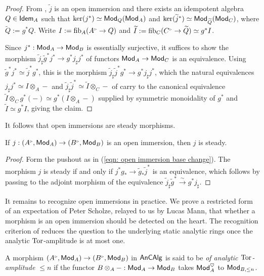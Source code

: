 \begin{proof}
    From , $\widetilde{j}$ is an open immersion and there exists an idempotent algebra $Q\in\mathsf{Idem}_{A}$ such that $\ker(j^{*})\simeq\mathsf{Mod}_{Q}(\mathsf{Mod}_{A})$ and $\ker(\widetilde{j}^{*})\simeq\mathsf{Mod}_{\widetilde{Q}}(\mathsf{Mod}_{C})$, where $\widetilde{Q}:=g^{*}Q$. Write $I:=\fib_{A}(A^{\tri}\to Q)$ and $\widetilde{I}:=\fib_{C}(C^{\tri}\to\widetilde{Q})\simeq g^{*}I$.

    Since $j^{*}:\mathsf{Mod}_{A}\to\mathsf{Mod}_{B}$ is essentially surjective, it suffices to show the morphism $\widetilde{j}_{\sharp}\widetilde{g}^{*}j^{*}\to g^{*}j_{\sharp}j^{*}$ of functors $\mathsf{Mod}_{A}\to\mathsf{Mod}_{C}$ is an equivalence. Using $\widetilde{g}^{*}j^{*}\simeq\widetilde{j}^{*}g^{*}$, this is the morphism $\widetilde{j}_{\sharp}\widetilde{j}^{*}g^{*}\to g^{*}j_{\sharp}j^{*}$, which the natural equivalences $j_{\sharp}j^{*}\simeq I\otimes_{A}-$ and $\widetilde{j}_{\sharp}\widetilde{j}^{*}\simeq\widetilde{I}\otimes_{C}-$ of \cite[Rmk. 5.1.5 (2)]{CamargoSolid} carry to the canonical equivalence $\widetilde{I}\otimes_{C}g^{*}(-)\simeq g^{*}(I\otimes_{A}-)$ supplied by symmetric monoidality of $g^{*}$ and $\widetilde{I}\simeq g^{*}I$, giving the claim.
\end{proof}
It follows that open immersions are steady morphisms. 
\begin{corollary}\label{cor: open immersions are steady}
    If $j:(A^{\tri},\Mod_{A})\to(B^{\tri},\Mod_{B})$ is an open immersion, then $j$ is steady. 
\end{corollary}
\begin{proof}
    Form the pushout as in (\ref{eqn: open immersion base change}). The morphism $j$ is steady if and only if $j^{*}g_{*}\to\widetilde{g}_{*}\widetilde{j}^{*}$ is an equivalence, which follows by passing to the adjoint morphism of the equivalence $\widetilde{j}_{\sharp}\widetilde{g}^{*}\xrightarrow{\sim}g^{*}j_{\sharp}$. 
\end{proof}
It remains to recognize open immersions in practice. We prove a restricted form of an expectation of Peter Scholze, relayed to us by Lucas Mann, that whether a morphism is an open immersion should be detected on the heart. The recognition criterion of  reduces the question to the underlying static analytic rings once the analytic $\mathrm{Tor}$-amplitude is at most one.
\begin{definition}\label{def: finite analytic tor-amplitude}
    A morphism $(A^{\tri},\Mod_{A})\to (B^{\tri},\Mod_{B})$ in $\mathsf{An}\mathsf{CAlg}$ is said to be \emph{of analytic $\mathrm{Tor}$-amplitude $\leq n$} if the functor $B\otimes_{A}-:\mathsf{Mod}_{A}\to\mathsf{Mod}_{B}$ takes $\mathsf{Mod}_{A}^{\heartsuit}$ to $\mathsf{Mod}_{B,\leq n}$. 
\end{definition}
